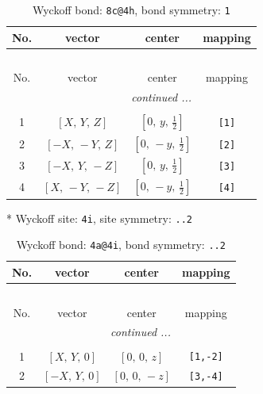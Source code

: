 \documentclass[fleqn,8pt]{jsarticle}
\begin{document}
\begin{longtable}{cccc}
\caption{Wyckoff bond: {\tt 8c@4h}, bond symmetry: {\tt 1}}
 \\
 \hline \hline
No. & vector & center & mapping \\ \hline \endfirsthead

\multicolumn{3}{l}{\tablename\ \thetable{}} \\
 \hline \hline
No. & vector & center & mapping \\ \hline \endhead

 \hline \hline
\multicolumn{3}{r}{\footnotesize\it continued ...} \\ \endfoot

 \hline \hline
\multicolumn{3}{r}{} \\ \endlastfoot

1 & $\left[ X,\, Y,\, Z \right]$ & $\left[ 0,\, y,\, \frac{1}{2} \right]$ & {\tt [1]} \\ \hline
2 & $\left[ - X,\, - Y,\, Z \right]$ & $\left[ 0,\, - y,\, \frac{1}{2} \right]$ & {\tt [2]} \\ \hline
3 & $\left[ - X,\, Y,\, - Z \right]$ & $\left[ 0,\, y,\, \frac{1}{2} \right]$ & {\tt [3]} \\ \hline
4 & $\left[ X,\, - Y,\, - Z \right]$ & $\left[ 0,\, - y,\, \frac{1}{2} \right]$ & {\tt [4]} \\
\end{longtable}
* Wyckoff site: {\tt 4i}, site symmetry: {\tt ..2}
\renewcommand{\arraystretch}{1.2}
\begin{longtable}{cccc}
\caption{Wyckoff bond: {\tt 4a@4i}, bond symmetry: {\tt ..2}}
 \\
 \hline \hline
No. & vector & center & mapping \\ \hline \endfirsthead

\multicolumn{3}{l}{\tablename\ \thetable{}} \\
 \hline \hline
No. & vector & center & mapping \\ \hline \endhead

 \hline \hline
\multicolumn{3}{r}{\footnotesize\it continued ...} \\ \endfoot

 \hline \hline
\multicolumn{3}{r}{} \\ \endlastfoot

1 & $\left[ X,\, Y,\, 0 \right]$ & $\left[ 0,\, 0,\, z \right]$ & {\tt [1,-2]} \\ \hline
2 & $\left[ - X,\, Y,\, 0 \right]$ & $\left[ 0,\, 0,\, - z \right]$ & {\tt [3,-4]} \\
\end{longtable}
\end{document}
